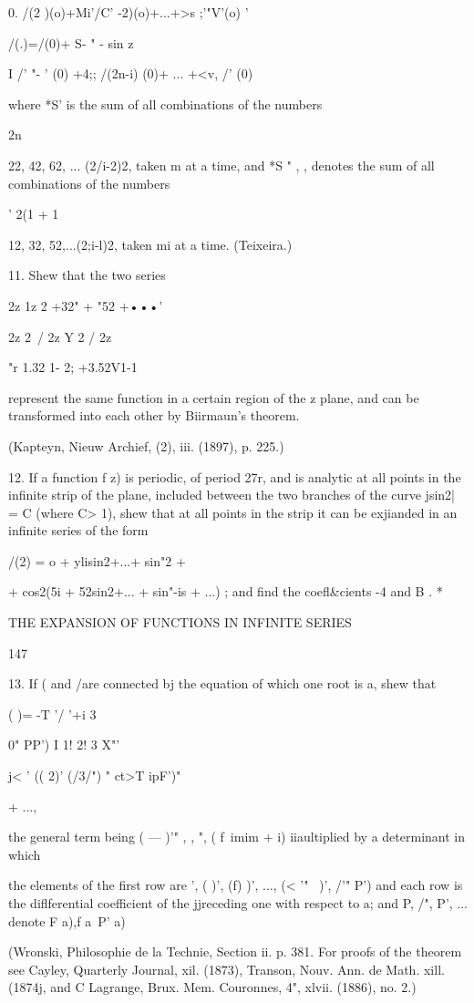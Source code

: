 {{0. /(2 )(o)+Mi'/C' -2)(o)+...+>s ;'"V'(o) '

/(.)=/(0)+ S- " - sin z

I /' "- ' (0) +4;; /(2n-i) (0)+ ... +<v, /' (0)

where *S' is the sum of all combinations of the numbers

2n

22, 42, 62, ... (2/i-2)2, taken m at a time, and *S " , , denotes the
sum of all combinations of the numbers

' 2(1 + 1

12, 32, 52,...(2;i-l)2, taken mi at a time. (Teixeira.)

11. Shew that the two series

2z 1z 2 +32" + "52 +•••'

2z 2\ / 2z Y 2 / 2z

 "r 1.32 1- 2; +3.52V1-1

represent the same function in a certain region of the z plane, and
can be transformed into each other by Biirmaun's theorem.

(Kapteyn, Nieuw Archief, (2), iii. (1897), p. 225.)

12. If a function f z) is periodic, of period 27r, and is analytic at
all points in the infinite strip of the plane, included between the
two branches of the curve jsin2| = C (where C> 1), shew that at all
points in the strip it can be exjianded in an infinite series of the
form

/(2) = o + ylisin2+...+ sin"2 +

+ cos2(5i + 52sin2+... + sin"-is + ...) ; and find the coefl\&cients
-4 and B . *

THE EXPANSION OF FUNCTIONS IN INFINITE SERIES

147

13. If ( and /are connected bj the equation of which one root is a,
shew that

 ( )= -T '/ '+i 3

0" PP') I 1! 2! 3 X"'

j< ' (( 2)' (/3/") " ct>T ipF')"

+ ...,

the general term being ( — )'" , , ", ( f\ imim + i) iiaultiplied by a
determinant in which

the elements of the first row are ', ( )', (f) )', ..., (< '"~ )', /'"
P') and each row is the diflferential coefficient of the jjreceding
one with respect to a; and P, /", P', ... denote F a),f a\ P' a)

(Wronski, Philosophie de la Technie, Section ii. p. 381. For proofs of
the theorem see Cayley, Quarterly Journal, xil. (1873), Transon, Nouv.
Ann. de Math. xill. (1874j, and C Lagrange, Brux. Mem. Couronnes, 4",
xlvii. (1886), no. 2.)

}}
